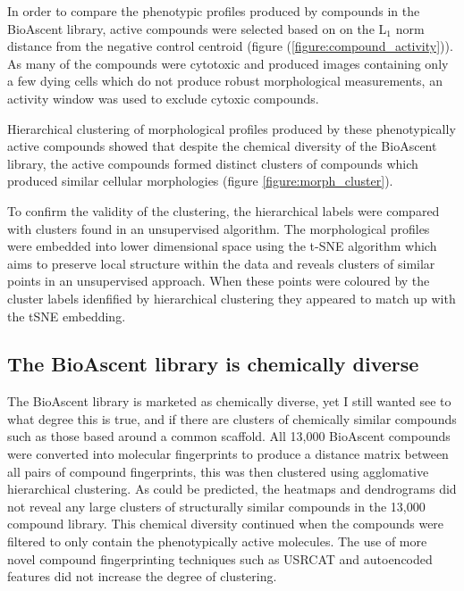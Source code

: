 \documentclass[a4paper,11pt,twoside,openright]{scrbook}
\begin{document}
In order to compare the phenotypic profiles produced by compounds in the BioAscent library, active compounds were selected based on on the L$_1$ norm distance from the negative control centroid (figure (\ref{figure:compound_activity})).
As many of the compounds were cytotoxic and produced images containing only a few dying cells which do not produce robust morphological measurements, an activity window was used to exclude cytoxic compounds.


Hierarchical clustering of morphological profiles produced by these phenotypically active compounds showed that despite the chemical diversity of the BioAscent library, the active compounds formed distinct clusters of compounds which produced similar cellular morphologies (figure \ref{figure:morph_cluster}).


To confirm the validity of the clustering, the hierarchical labels were compared with clusters found in an unsupervised algorithm.
The morphological profiles were embedded into lower dimensional space using the t-SNE algorithm \cite{tnse_paper} which aims to preserve local structure within the data and reveals clusters of similar points in an unsupervised approach.
When these points were coloured by the cluster labels idenfified by hierarchical clustering they appeared to match up with the tSNE embedding.




\subsection{The BioAscent library is chemically diverse}
The BioAscent library is marketed as chemically diverse, yet I still wanted see to what degree this is true, and if there are clusters of chemically similar compounds such as those based around a common scaffold.
All 13,000 BioAscent compounds were converted into molecular fingerprints to produce a distance matrix between all pairs of compound fingerprints, this was then clustered using agglomative hierarchical clustering.
As could be predicted, the heatmaps and dendrograms did not reveal any large clusters of structurally similar compounds in the 13,000 compound library.
This chemical diversity continued when the compounds were filtered to only contain the phenotypically active molecules.
The use of more novel compound fingerprinting techniques such as USRCAT \cite{usercat} and autoencoded features \cite{autoencoder} did not increase the degree of clustering.
\end{document}
